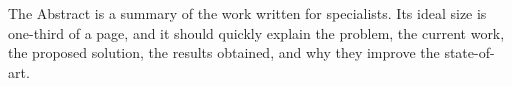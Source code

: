The Abstract is a summary of the work written for specialists. Its ideal size is
one-third of a page, and it should quickly explain the problem, the current
work, the proposed solution, the results obtained, and why they improve the
state-of-art.
